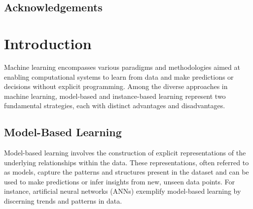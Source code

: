 \documentclass[a4paper, 12pt]{report}
\begin{document}
\section*{Acknowledgements}


\tableofcontents

\listoffigures

\listoftables

\raggedright
\chapter{Introduction}
\label{ch:introduction}

Machine learning encompasses various paradigms and methodologies aimed at enabling computational systems to learn from data and make predictions or decisions without explicit programming.
Among the diverse approaches in machine learning, model-based and instance-based learning represent two fundamental strategies, each with distinct advantages and disadvantages.

\section{Model-Based Learning}

Model-based learning involves the construction of explicit representations of the underlying relationships within the data.
These representations, often referred to as models, capture the patterns and structures present in the dataset and can be used to make predictions or infer insights from new, unseen data points.
For instance, artificial neural networks (ANNs) exemplify model-based learning by discerning trends and patterns in data.
\end{document}

